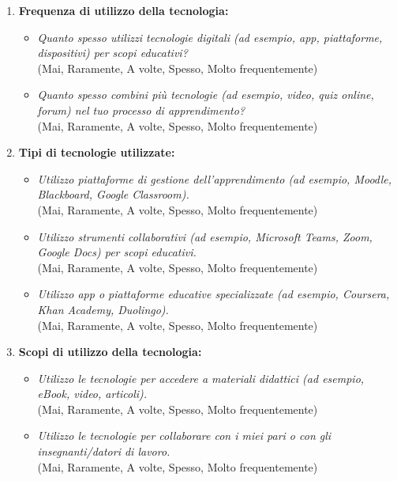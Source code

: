 \begin{enumerate}
    \item \textbf{Frequenza di utilizzo della tecnologia:}
    \begin{itemize}
        \item \textit{Quanto spesso utilizzi tecnologie digitali (ad esempio, app, piattaforme, dispositivi) per scopi educativi?}\\
        (Mai, Raramente, A volte, Spesso, Molto frequentemente)
        \item \textit{Quanto spesso combini più tecnologie (ad esempio, video, quiz online, forum) nel tuo processo di apprendimento?}\\
        (Mai, Raramente, A volte, Spesso, Molto frequentemente)
    \end{itemize}
    
    \item \textbf{Tipi di tecnologie utilizzate:}
    \begin{itemize}
        \item \textit{Utilizzo piattaforme di gestione dell'apprendimento (ad esempio, Moodle, Blackboard, Google Classroom).}\\
        (Mai, Raramente, A volte, Spesso, Molto frequentemente)
        \item \textit{Utilizzo strumenti collaborativi (ad esempio, Microsoft Teams, Zoom, Google Docs) per scopi educativi.}\\
        (Mai, Raramente, A volte, Spesso, Molto frequentemente)
        \item \textit{Utilizzo app o piattaforme educative specializzate (ad esempio, Coursera, Khan Academy, Duolingo).}\\
        (Mai, Raramente, A volte, Spesso, Molto frequentemente)
    \end{itemize}
    
    \item \textbf{Scopi di utilizzo della tecnologia:}
    \begin{itemize}
        \item \textit{Utilizzo le tecnologie per accedere a materiali didattici (ad esempio, eBook, video, articoli).}\\
        (Mai, Raramente, A volte, Spesso, Molto frequentemente)
        \item \textit{Utilizzo le tecnologie per collaborare con i miei pari o con gli insegnanti/datori di lavoro.}\\
        (Mai, Raramente, A volte, Spesso, Molto frequentemente)
    \end{itemize}
    

\end{enumerate}
